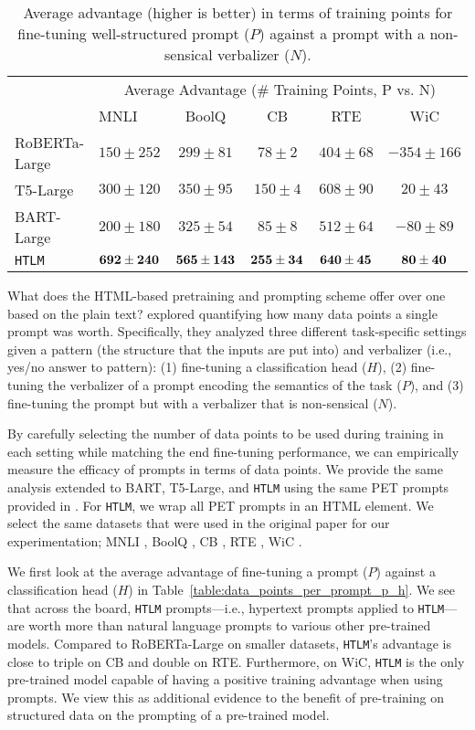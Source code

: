 \documentclass[11pt,a4paper]{article}
\newcommand{\HTLM}{\texttt{HTLM}}
\begin{document}
\begin{table*}[htpb!]
\centering
\begin{tabular}{@{}l lcccc@{}}
\toprule 
& \multicolumn{5}{c}{Average Advantage (\# Training Points, P vs. N)} \\
& MNLI & BoolQ & CB & RTE & WiC\\\midrule 
RoBERTa-Large & $150\pm252$ & $299\pm81$ & $78\pm2$ & $404\pm68$ & $-354\pm166$\\
T5-Large & $300\pm120$ & $350\pm95$ & $150\pm4$ & $608\pm90$ & $20\pm43$\\
BART-Large & $200\pm180$ & $325\pm54$ & $85\pm8$ & $512\pm64$ & $-80\pm89$\\ \midrule
\HTLM{} & $\bf{692\pm240}$ & $\bf{565\pm143}$ & $\bf{255\pm34}$ & $\bf{640\pm45}$ & $\bf{80\pm40}$\\
\bottomrule
\end{tabular}
\caption{Average advantage (higher is better) in terms of training points for fine-tuning well-structured prompt ($P$) against a prompt with a non-sensical verbalizer ($N$). }
\label{table:data_points_per_prompt_p_n}
\end{table*}


What does the HTML-based pretraining and prompting scheme offer over one based on the plain text? \citet{how_many_datapoints} explored quantifying how many data points a single prompt was worth. Specifically, they analyzed three different task-specific settings given a pattern (the structure that the inputs are put into) and verbalizer (i.e., yes/no answer to pattern): (1) fine-tuning a classification head ($H$), (2) fine-tuning the verbalizer of a prompt encoding the semantics of the task ($P$), and (3) fine-tuning the prompt but with a verbalizer that is non-sensical ($N$).

By carefully selecting the number of data points to be used during training in each setting while matching the end fine-tuning performance, we can empirically measure the efficacy of prompts in terms of data points. We provide the same analysis extended to BART, T5-Large, and \HTLM{} using the same PET prompts provided in \citet{itsnotjustsize}. For \HTLM{}, we wrap all PET prompts in an HTML element. We select the same datasets that were used in the original paper for our experimentation; MNLI \citep{mnli}, BoolQ \citep{clark2019boolq}, CB \cite{demarneffe:cb}, RTE \citep{rte}, WiC \cite{pilehvar2018wic}.

We first look at the average advantage of fine-tuning a prompt ($P$) against a classification head ($H$) in Table~\ref{table:data_points_per_prompt_p_h}. We see that across the board, \HTLM{} prompts---i.e., hypertext prompts applied to \HTLM{}---are worth more than natural language prompts to various other pre-trained models. Compared to RoBERTa-Large on smaller datasets, \HTLM{}'s advantage is close to triple on CB and double on RTE. Furthermore, on WiC, \HTLM{} is the only pre-trained model capable of having a positive training advantage when using prompts. We view this as additional evidence to the benefit of pre-training on structured data on the prompting of a pre-trained model.
\end{document}
